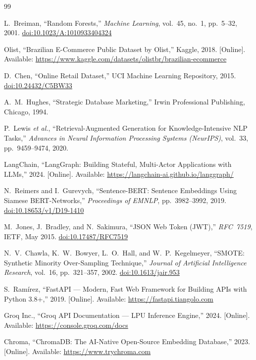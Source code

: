 \documentclass[conference]{IEEEtran}
\newcommand{\doi}[1]{\href{https://doi.org/#1}{doi:#1}}
\begin{document}
\begin{thebibliography}{99}

L.\ Breiman, ``Random Forests,''
\textit{Machine Learning}, vol.~45, no.~1, pp.~5--32, 2001.
\doi{10.1023/A:1010933404324}

Olist, ``Brazilian E-Commerce Public Dataset by Olist,''
Kaggle, 2018. [Online].
Available: \url{https://www.kaggle.com/datasets/olistbr/brazilian-ecommerce}

D.\ Chen, ``Online Retail Dataset,''
UCI Machine Learning Repository, 2015.
\doi{10.24432/C5BW33}

A.\ M.\ Hughes, ``Strategic Database Marketing,''
Irwin Professional Publishing, Chicago, 1994.

P.\ Lewis \textit{et al.},
``Retrieval-Augmented Generation for Knowledge-Intensive NLP Tasks,''
\textit{Advances in Neural Information Processing Systems (NeurIPS)},
vol.~33, pp.~9459--9474, 2020.

LangChain, ``LangGraph: Building Stateful, Multi-Actor Applications with LLMs,''
2024. [Online].
Available: \url{https://langchain-ai.github.io/langgraph/}

N.\ Reimers and I.\ Gurevych,
``Sentence-BERT: Sentence Embeddings Using Siamese BERT-Networks,''
\textit{Proceedings of EMNLP}, pp.~3982--3992, 2019.
\doi{10.18653/v1/D19-1410}

M.\ Jones, J.\ Bradley, and N.\ Sakimura,
``JSON Web Token (JWT),''
\textit{RFC~7519}, IETF, May 2015.
\doi{10.17487/RFC7519}

N.\ V.\ Chawla, K.\ W.\ Bowyer, L.\ O.\ Hall, and W.\ P.\ Kegelmeyer,
``SMOTE: Synthetic Minority Over-Sampling Technique,''
\textit{Journal of Artificial Intelligence Research}, vol.~16, pp.~321--357, 2002.
\doi{10.1613/jair.953}

S.\ Ramírez, ``FastAPI — Modern, Fast Web Framework for Building APIs with Python 3.8+,''
2019. [Online]. Available: \url{https://fastapi.tiangolo.com}

Groq Inc., ``Groq API Documentation — LPU Inference Engine,''
2024. [Online]. Available: \url{https://console.groq.com/docs}

Chroma, ``ChromaDB: The AI-Native Open-Source Embedding Database,''
2023. [Online]. Available: \url{https://www.trychroma.com}


\end{thebibliography}
\end{document}
